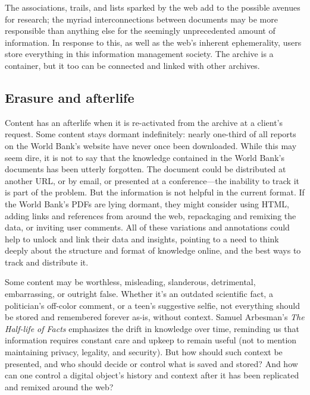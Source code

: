 The associations, trails, and lists sparked by the web add to the possible avenues for research; the myriad interconnections between documents may be more responsible than anything else for the seemingly unprecedented amount of information. In response to this, as well as the web's inherent ephemerality, users store everything in this information management society. The archive is a container, but it too can be connected and linked with other archives.

\subsection{Erasure and afterlife}

Content has an afterlife when it is re-activated from the archive at a client's request. Some content stays dormant indefinitely: nearly one-third of all reports on the World Bank's website have never once been downloaded.\autocite{trevino_which_2014} While this may seem dire, it is not to say that the knowledge contained in the World Bank's documents has been utterly forgotten. The document could be distributed at another URL, or by email, or presented at a conference---the inability to track it is part of the problem. But the information is not helpful in the current format. If the World Bank's PDFs are lying dormant, they might consider using HTML, adding links and references from around the web, repackaging and remixing the data, or inviting user comments. All of these variations and annotations could help to unlock and link their data and insights, pointing to a need to think deeply about the structure and format of knowledge online, and the best ways to track and distribute it.

Some content may be worthless, misleading, slanderous, detrimental, embarrassing, or outright false. Whether it's an outdated scientific fact, a politician's off-color comment, or a teen's suggestive selfie, not everything should be stored and remembered forever as-is, without context. Samuel Arbesman's \emph{The Half-life of Facts} emphasizes the drift in knowledge over time, reminding us that information requires constant care and upkeep to remain useful (not to mention maintaining privacy, legality, and security).\autocite{arbesman_half-life_2012} But how should such context be presented, and who should decide or control what is saved and stored? And how can one control a digital object's history and context after it has been replicated and remixed around the web?

